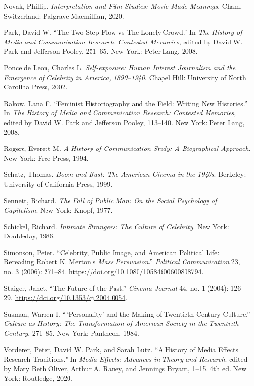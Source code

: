 \documentclass{tufte-handout}
\begin{document}
\begin{hangparas}{.25in}{1}
Novak, Phillip. \emph{Interpretation and Film Studies: Movie Made
Meanings}. Cham, Switzerland: Palgrave Macmillian, 2020.

Park, David W. ``The Two-Step Flow vs The Lonely Crowd.'' In \emph{The
History of Media and Communication Research: Contested Memories}, edited
by David W. Park and Jefferson Pooley, 251--65. New York: Peter Lang,
2008.

Ponce de Leon, Charles L. \emph{Self-exposure: Human Interest Journalism
and the Emergence of Celebrity in America, 1890--1940}. Chapel Hill:
University of North Carolina Press, 2002.

Rakow, Lana F. ``Feminist Historiography and the Field: Writing New
Histories.'' In \emph{The History of Media and Communication Research:
Contested Memories}, edited by David W. Park and Jefferson Pooley,
113--140. New York: Peter Lang, 2008.

Rogers, Everett M. \emph{A History of Communication Study: A
Biographical Approach}. New York: Free Press, 1994.

Schatz, Thomas. \emph{Boom and Bust: The American Cinema in the 1940s}.
Berkeley: University of California Press, 1999.

Sennett, Richard. \emph{The Fall of Public Man: On the Social Psychology
of Capitalism}. New York: Knopf, 1977.

Schickel, Richard. \emph{Intimate Strangers: The Culture of Celebrity}.
New York: Doubleday, 1986.

Simonson, Peter. ``Celebrity, Public Image, and American Political Life:
Rereading Robert K. Merton's \emph{Mass Persuasion}.'' \emph{Political
Communication} 23, no. 3 (2006): 271--84.
\url{https://doi.org/10.1080/10584600600808794}.

Staiger, Janet. ``The Future of the Past.'' \emph{Cinema Journal} 44,
no. 1 (2004): 126--29. \url{https://doi.org/10.1353/cj.2004.0054}.

Susman, Warren I. ``\,`Personality' and the Making of Twentieth-Century
Culture.'' \emph{Culture as History: The Transformation of American
Society in the Twentieth Century}, 271--85. New York: Pantheon, 1984.

Vorderer, Peter, David W. Park, and Sarah Lutz. ``A History of Media
Effects Research Traditions." In \emph{Media Effects: Advances in Theory
and Research}. edited by Mary Beth Oliver, Arthur A. Raney, and Jennings
Bryant, 1--15. 4th ed. New York: Routledge, 2020.



\end{hangparas}
\end{document}
